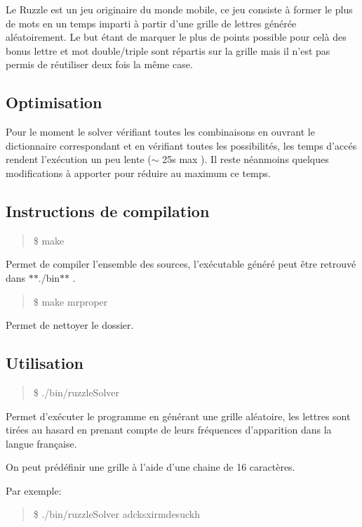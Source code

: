 Le Ruzzle est un jeu originaire du monde mobile, ce jeu consiste à former le plus de mots en un temps imparti à partir d'une grille de lettres générée aléatoirement. Le but étant de marquer le plus de points possible pour celà des bonus lettre et mot double/triple sont répartis sur la grille mais il n'est pas permis de réutiliser deux fois la même case.

\subsection*{Optimisation}

Pour le moment le solver vérifiant toutes les combinaisons en ouvrant le dictionnaire correspondant et en vérifiant toutes les possibilités, les temps d'accés rendent l'exécution un peu lente ($\sim$ 25s max ). Il reste néanmoins quelques modifications à apporter pour réduire au maximum ce temps.

\subsection*{Instructions de compilation}

\begin{quote}
\$ make \end{quote}


Permet de compiler l'ensemble des sources, l'exécutable généré peut être retrouvé dans $\ast$$\ast$./bin$\ast$$\ast$ .

\begin{quote}
\$ make mrproper \end{quote}


Permet de nettoyer le dossier.

\subsection*{Utilisation}

\begin{quote}
\$ ./bin/ruzzle\+Solver \end{quote}


Permet d'exécuter le programme en générant une grille aléatoire, les lettres sont tirées au hasard en prenant compte de leurs fréquences d'apparition dans la langue française.

On peut prédéfinir une grille à l'aide d'une chaine de 16 caractères.

Par exemple\+:

\begin{quote}
\$ ./bin/ruzzle\+Solver adcksxirmdesuckh \end{quote}


